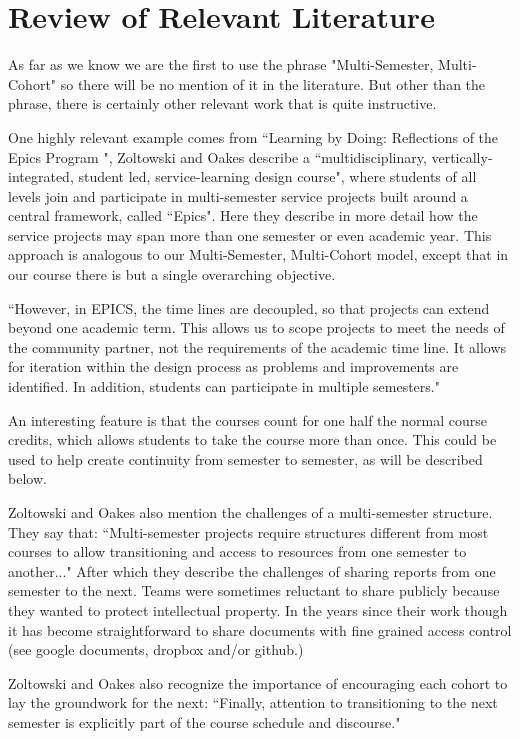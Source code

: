 \section{Review of Relevant Literature}

As far as we know we are the first to use the phrase "Multi-Semester, Multi-Cohort" so there will be no mention of it in the literature. But other than the phrase, there is certainly other relevant work that is quite instructive. 

One highly relevant example comes from ``Learning by Doing: Reflections of the Epics Program \cite{Epics}", Zoltowski and Oakes describe a ``multidisciplinary, vertically-integrated, student led, service-learning design course", where students of all levels join and participate in multi-semester service projects built around a central framework, called ``Epics". Here they describe in more detail how the service projects may span more than one semester or even academic year. This approach is analogous to our Multi-Semester, Multi-Cohort model, except that in our course there is but a single overarching objective. 

``However, in EPICS, the time lines are decoupled, so that projects can extend beyond one academic term. This allows us to scope projects to meet the needs of the community partner, not the requirements of the academic time line. It allows for iteration within the design process as problems and improvements are identified. In addition, students can participate in multiple semesters."

An interesting feature is that the courses count for one half the normal course credits, which allows students to take the course more than once. This could be used to help create continuity from semester to semester, as will be described below. 

Zoltowski and Oakes also mention the challenges of a multi-semester structure. They say that:  ``Multi-semester projects require structures different from most courses to allow transitioning and access to resources from one semester to another..." After which they describe the challenges of sharing reports from one semester to the next. Teams were sometimes reluctant to share publicly because they wanted to protect intellectual property. In the years since their work though it has become straightforward to share documents with fine grained access control (see google documents, dropbox and/or github.)

Zoltowski and Oakes also recognize the importance of encouraging each cohort to lay the groundwork for the next: ``Finally, attention to transitioning to the next semester is explicitly part of the course schedule and discourse."


